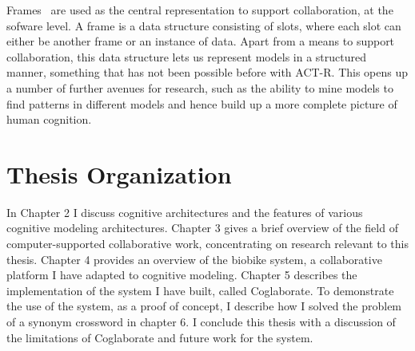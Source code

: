 Frames~\cite{Minsky1974a} are used as the central representation to
support collaboration, at the sofware level.  A frame is a data
structure consisting of slots, where each slot can either be another
frame or an instance of data. Apart from a means to support
collaboration, this data structure lets us represent models in a
structured manner, something that has not been possible before with
ACT-R.  This opens up a number of further avenues for research, such
as the ability to mine models to find patterns in different models and
hence build up a more complete picture of human cognition.



\section{Thesis Organization}
In Chapter 2 I discuss cognitive architectures and the features of
various cognitive modeling architectures. Chapter 3 gives a brief
overview of the field of computer-supported collaborative work,
concentrating on research relevant to this thesis.  Chapter 4 provides
an overview of the biobike system, a collaborative platform I have
adapted to cognitive modeling.  Chapter 5 describes the implementation
of the system I have built, called Coglaborate.  To demonstrate the
use of the system, as a proof of concept, I describe how I solved the
problem of a synonym crossword in chapter 6.  I conclude this thesis
with a discussion of the limitations of Coglaborate and future work
for the system.
